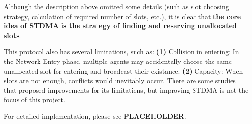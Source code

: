 Although the description above omitted some details (such as slot choosing strategy, calculation of required number of slots, etc.), it is clear that \textbf{the core idea of STDMA is the strategy of finding and reserving unallocated slots}.

This protocol also has several limitations, such as: \textbf{(1)} Collision in entering: In the Network Entry phase, multiple agents may accidentally choose the same unallocated slot for entering and broadcast their existance. \textbf{(2)} Capacity: When slots are not enough, conflicts would inevitably occur. 
There are some studies \cite{STDMA_improv1,STDMA_improv2} that proposed improvements for its limitations, but improving STDMA is not the focus of this project.

For detailed implementation, please see \textbf{PLACEHOLDER}.


